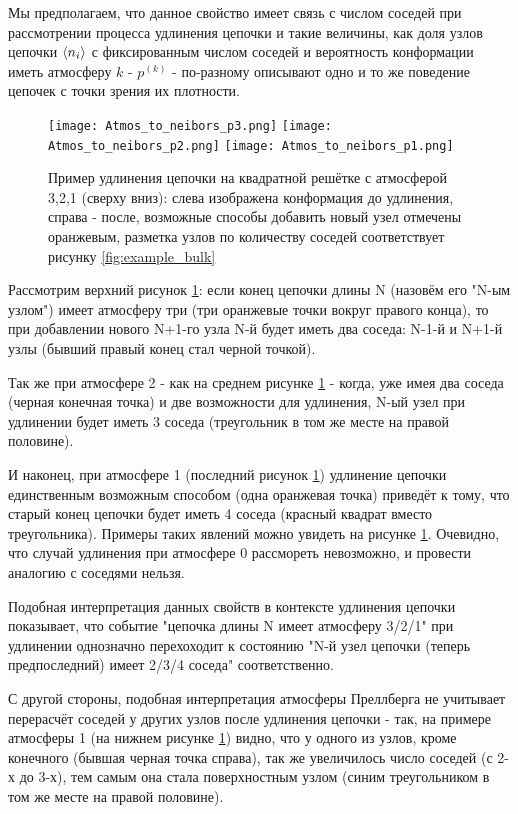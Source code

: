 Мы предполагаем, что данное свойство имеет связь с числом соседей при рассмотрении процесса удлинения цепочки и такие величины, как доля узлов цепочки $\langle n_{i} \rangle$ с фиксированным числом соседей и вероятность конформации иметь атмосферу $k$ - $p^{(k)}$ - по-разному описывают одно и то же поведение цепочек с точки зрения их плотности.

\begin{figure}
    \centering
    \texttt{[image: Atmos\_to\_neibors\_p3.png]}
    \texttt{[image: Atmos\_to\_neibors\_p2.png]}
    \texttt{[image: Atmos\_to\_neibors\_p1.png]}
    \caption{Пример удлинения цепочки на квадратной решётке с атмосферой 3,2,1 (сверху вниз): слева изображена конформация до удлинения, справа - после, возможные способы добавить новый узел отмечены оранжевым, разметка узлов по количеству соседей соответствует рисунку \ref{fig:example_bulk}}
    \label{fig:atmos_neighs}
\end{figure}

Рассмотрим верхний рисунок \ref{fig:atmos_neighs}: если конец цепочки длины N (назовём его "N-ым узлом") имеет атмосферу три (три оранжевые точки вокруг правого конца), то при добавлении нового N+1-го узла N-й будет иметь два соседа: N-1-й и N+1-й узлы (бывший правый конец стал черной точкой). 

Так же при атмосфере 2 - как на среднем рисунке \ref{fig:atmos_neighs} - когда, уже имея два соседа (черная конечная точка) и две возможности для удлинения, N-ый узел при удлинении будет иметь 3 соседа (треугольник в том же месте на правой половине). 

И наконец, при атмосфере 1 (последний рисунок \ref{fig:atmos_neighs}) удлинение цепочки единственным возможным способом (одна оранжевая точка) приведёт к тому, что старый конец цепочки будет иметь 4 соседа (красный квадрат вместо треугольника). Примеры таких явлений можно увидеть на рисунке \ref{fig:atmos_neighs}. Очевидно, что случай удлинения при атмосфере 0 рассмореть невозможно, и провести аналогию с соседями нельзя.

Подобная интерпретация данных свойств в контексте удлинения цепочки показывает, что событие "цепочка длины N имеет атмосферу 3/2/1" при удлинении однозначно перехоходит к состоянию "N-й узел цепочки (теперь предпоследний) имеет 2/3/4 соседа" соответственно.

С другой стороны, подобная интерпретация атмосферы Преллберга не учитывает перерасчёт соседей у других узлов после удлинения цепочки - так, на примере атмосферы 1 (на нижнем рисунке \ref{fig:atmos_neighs}) видно, что у одного из узлов, кроме конечного (бывшая черная точка справа), так же увеличилось число соседей (с 2-х до 3-х), тем самым она стала поверхностным узлом (синим треугольником в том же месте на правой половине).

